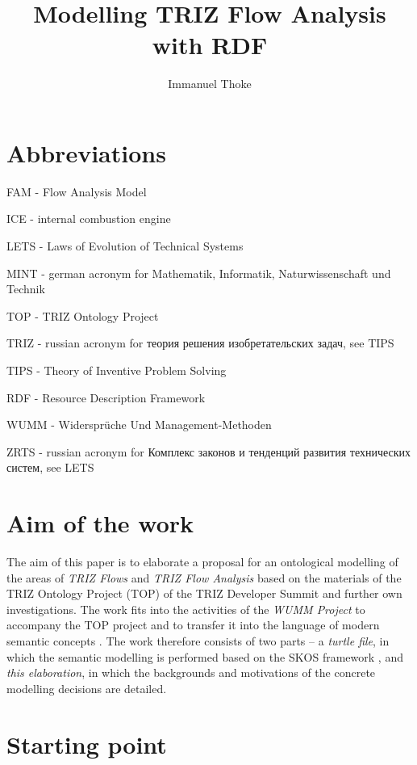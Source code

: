 \documentclass[a4paper,11pt]{article}
\author{Immanuel Thoke}
\title{Modelling TRIZ Flow Analysis with RDF}
\begin{document}
    \maketitle
    \tableofcontents
    \newpage
    \section{Abbreviations}
    FAM - Flow Analysis Model

    ICE - internal combustion engine

    LETS - Laws of Evolution of Technical Systems

    MINT - german acronym for Mathematik, Informatik, Naturwissenschaft und Technik

    TOP - TRIZ Ontology Project

    TRIZ - russian acronym for \foreignlanguage{russian}{теория решения изобретательских задач}, see TIPS

    TIPS - Theory of Inventive Problem Solving 

    RDF - Resource Description Framework 

    WUMM - Widersprüche Und Management-Methoden

    ZRTS - russian acronym for \foreignlanguage{russian}{Комплекс законов и тенденций развития технических систем}, see LETS

    \newpage

    \section{Aim of the work}

    The aim of this paper is to elaborate a proposal for an ontological modelling
    of the areas of \emph{TRIZ Flows} and \emph{TRIZ Flow Analysis} based on the
    materials of the TRIZ Ontology Project (TOP) of the TRIZ Developer Summit
    \cite{TOP} and further own investigations. The work fits into the activities
    of the \emph{WUMM Project} \cite{WUMM} to accompany the TOP project and to
    transfer it into the language of modern semantic concepts
    \cite{WUMM-Ontology}.  The work therefore consists of two parts -- a
    \emph{turtle file}, in which the semantic modelling is performed based on the
    SKOS framework \cite{SKOS}, and \emph{this elaboration}, in which the
    backgrounds and motivations of the concrete modelling decisions are detailed.

    \section{Starting point} 
\end{document}
